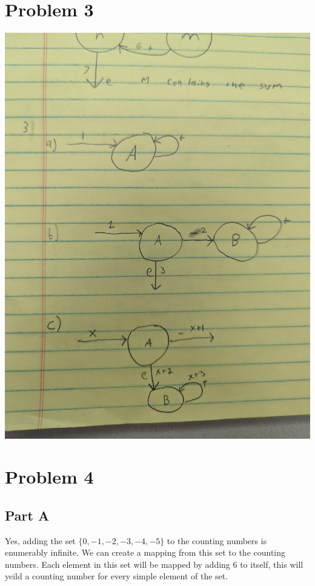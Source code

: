 \documentclass[12pt]{article}
\begin{document}
\section*{Problem 3}

\includegraphics[width=\textwidth]{3}


\section*{Problem 4}


\subsection*{Part A}

Yes, adding the set $\{0, -1, -2, -3, -4, -5\}$ to the counting numbers is enumerably infinite. We can create a mapping from this set to the counting numbers. Each element in this set will be mapped by adding 6 to itself, this will yeild a counting number for every simple element of the set. 
\end{document}
